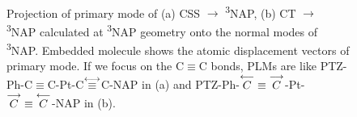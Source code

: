 \begin{figure}[]
\\
\caption{
Projection of primary mode of (a) CSS $\rightarrow$ \textsuperscript{3}NAP, (b) CT $\rightarrow$ \textsuperscript{3}NAP calculated at \textsuperscript{3}NAP geometry onto the normal modes of \textsuperscript{3}NAP. Embedded molecule shows the atomic displacement vectors of primary mode. If we focus on the C$\equiv$C bonds, PLMs are like
PTZ-Ph-C$\equiv$C-Pt-C$\protect\overset{\longleftrightarrow}{\equiv}$C-NAP
in (a) and
PTZ-Ph-$\protect\overset{\longleftarrow}{C}\equiv\protect\overset{\longrightarrow}{C}$-Pt-$\protect\overset{\longrightarrow}{C}\equiv\protect\overset{\longleftarrow}{C}$-NAP
in (b).}\label{projT1}
\end{figure}

